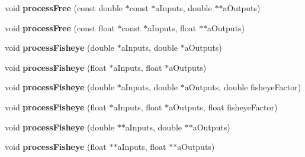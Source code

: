 \begin{DoxyCompactItemize}
\item 
\hypertarget{class_ambisonic_recomposer_af1a7d78f0275bd42cc61120b888c9c39}{void {\bfseries process\-Free} (const double $\ast$const $\ast$a\-Inputs, double $\ast$$\ast$a\-Outputs)}\label{class_ambisonic_recomposer_af1a7d78f0275bd42cc61120b888c9c39}

\item 
\hypertarget{class_ambisonic_recomposer_afb755ab7910886bb49d59cddd46b1b34}{void {\bfseries process\-Free} (const float $\ast$const $\ast$a\-Inputs, float $\ast$$\ast$a\-Outputs)}\label{class_ambisonic_recomposer_afb755ab7910886bb49d59cddd46b1b34}

\item 
\hypertarget{class_ambisonic_recomposer_a9c4a0fe3170bfd79f0bf60015a0ac870}{void {\bfseries process\-Fisheye} (double $\ast$a\-Inputs, double $\ast$a\-Outputs)}\label{class_ambisonic_recomposer_a9c4a0fe3170bfd79f0bf60015a0ac870}

\item 
\hypertarget{class_ambisonic_recomposer_aed427ad5f2ad18d90877754fe116249d}{void {\bfseries process\-Fisheye} (float $\ast$a\-Inputs, float $\ast$a\-Outputs)}\label{class_ambisonic_recomposer_aed427ad5f2ad18d90877754fe116249d}

\item 
\hypertarget{class_ambisonic_recomposer_aee3b5a32b69b41dec23db5da6ae2498e}{void {\bfseries process\-Fisheye} (double $\ast$a\-Inputs, double $\ast$a\-Outputs, double fisheye\-Factor)}\label{class_ambisonic_recomposer_aee3b5a32b69b41dec23db5da6ae2498e}

\item 
\hypertarget{class_ambisonic_recomposer_a3c67709bd672f243b481cec53cf86833}{void {\bfseries process\-Fisheye} (float $\ast$a\-Inputs, float $\ast$a\-Outputs, float fisheye\-Factor)}\label{class_ambisonic_recomposer_a3c67709bd672f243b481cec53cf86833}

\item 
\hypertarget{class_ambisonic_recomposer_a0fdbe18c57e2161f76b3f278be8a98f6}{void {\bfseries process\-Fisheye} (double $\ast$$\ast$a\-Inputs, double $\ast$$\ast$a\-Outputs)}\label{class_ambisonic_recomposer_a0fdbe18c57e2161f76b3f278be8a98f6}

\item 
\hypertarget{class_ambisonic_recomposer_aa0c7aebe2e5da500a4620d3920ef2ba0}{void {\bfseries process\-Fisheye} (float $\ast$$\ast$a\-Inputs, float $\ast$$\ast$a\-Outputs)}\label{class_ambisonic_recomposer_aa0c7aebe2e5da500a4620d3920ef2ba0}


\end{DoxyCompactItemize}

